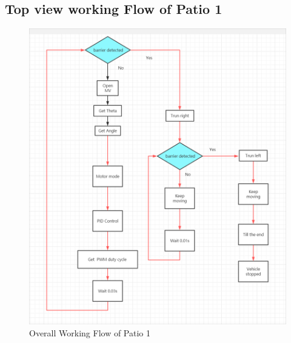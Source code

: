 \documentclass[12pt, a4paper, oneside]{report}
\begin{document}
\subsection{Top view working Flow of Patio 1}
\vspace{\baselineskip}
\vspace{\baselineskip}
\vspace{\baselineskip}
\begin{figure}[H]
    \centering
    \includegraphics[scale=0.43]{pic/patio1/1.png}
    \caption{Overall Working Flow of Patio 1}
    \label{owfp}
\end{figure}

\newpage
\end{document}

